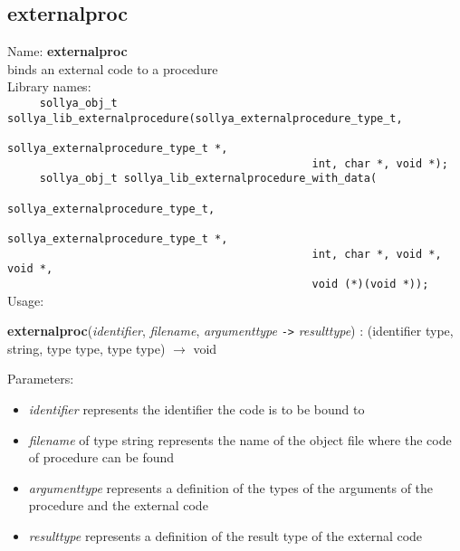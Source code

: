 \subsection{externalproc}
\label{labexternalproc}
\noindent Name: \textbf{externalproc}\\
\phantom{aaa}binds an external code to a \sollya procedure\\[0.2cm]
\noindent Library names:\\
\verb|     sollya_obj_t sollya_lib_externalprocedure(sollya_externalprocedure_type_t, |\\
\verb|                                               sollya_externalprocedure_type_t *,|\\
\verb|                                               int, char *, void *);|\\
\verb|     sollya_obj_t sollya_lib_externalprocedure_with_data(|\\
\verb|                                               sollya_externalprocedure_type_t, |\\
\verb|                                               sollya_externalprocedure_type_t *,|\\
\verb|                                               int, char *, void *, void *,|\\
\verb|                                               void (*)(void *));|\\[0.2cm]
\noindent Usage: 
\begin{center}
\textbf{externalproc}(\emph{identifier}, \emph{filename}, \emph{argumenttype} \texttt{->} \emph{resulttype}) : (\textsf{identifier type}, \textsf{string}, \textsf{type type}, \textsf{type type}) $\rightarrow$ \textsf{void}\\
\end{center}
Parameters: 
\begin{itemize}
\item \emph{identifier} represents the identifier the code is to be bound to
\item \emph{filename} of type \textsf{string} represents the name of the object file where the code of procedure can be found
\item \emph{argumenttype} represents a definition of the types of the arguments of the \sollya procedure and the external code
\item \emph{resulttype} represents a definition of the result type of the external code
\end{itemize}
